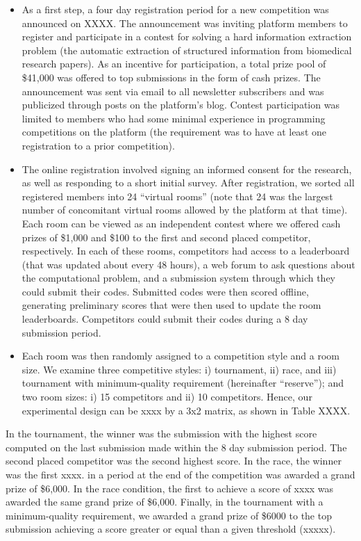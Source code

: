 \documentclass[11pt, titlepage]{article}
\begin{document}
\begin{itemize}
\item
  As a first step, a four day registration period for a new competition
  was announced on XXXX. The announcement was inviting platform members
  to register and participate in a contest for solving a hard
  information extraction problem (the automatic extraction of structured
  information from biomedical research papers). As an incentive for
  participation, a total prize pool of \$41,000 was offered to top
  submissions in the form of cash prizes. The announcement was sent via
  email to all newsletter subscribers and was publicized through posts
  on the platform's blog. Contest participation was limited to members
  who had some minimal experience in programming competitions on the
  platform (the requirement was to have at least one registration to a
  prior competition).
\item
  The online registration involved signing an informed consent for the
  research, as well as responding to a short initial survey. After
  registration, we sorted all registered members into 24 ``virtual
  rooms'' (note that 24 was the largest number of concomitant virtual
  rooms allowed by the platform at that time). Each room can be viewed
  as an independent contest where we offered cash prizes of \$1,000 and
  \$100 to the first and second placed competitor, respectively. In each
  of these rooms, competitors had access to a leaderboard (that was
  updated about every 48 hours), a web forum to ask questions about the
  computational problem, and a submission system through which they
  could submit their codes. Submitted codes were then scored offline,
  generating preliminary scores that were then used to update the room
  leaderboards. Competitors could submit their codes during a 8 day
  submission period.
\item
  Each room was then randomly assigned to a competition style and a room
  size. We examine three competitive styles: i) tournament, ii) race,
  and iii) tournament with minimum-quality requirement (hereinafter
  ``reserve''); and two room sizes: i) 15 competitors and ii) 10
  competitors. Hence, our experimental design can be xxxx by a 3x2
  matrix, as shown in Table XXXX.
\end{itemize}

In the tournament, the winner was the submission with the highest score
computed on the last submission made within the 8 day submission period.
The second placed competitor was the second highest score. In the race,
the winner was the first xxxx. in a period at the end of the competition
was awarded a grand prize of \$6,000. In the race condition, the first
to achieve a score of xxxx was awarded the same grand prize of \$6,000.
Finally, in the tournament with a minimum-quality requirement, we
awarded a grand prize of \$6000 to the top submission achieving a score
greater or equal than a given threshold (xxxxx).
\end{document}

